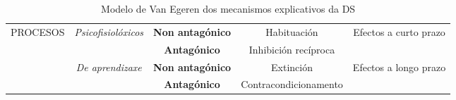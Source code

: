 \documentclass[a4paper,11pt]{article}
\begin{document}
\begin{table}[h!]
\centering
\begin{tabular}{|c|c|c|c|c|}
\hline
\multirow{4}{*}{PROCESOS} & \multirow{2}{*}{\textit{Psicofisiolóxicos}} & \textbf{Non antagónico} & Habituación & \multirow{2}{*}{Efectos a curto prazo} \\ \cline{3-4}
 &  & \textbf{Antagónico} & Inhibición recíproca &  \\ \cline{2-5} 
 & \multirow{2}{*}{\textit{De aprendizaxe}} & \textbf{Non antagónico} & Extinción & \multirow{2}{*}{Efectos a longo prazo} \\ \cline{3-4}
 &  & \textbf{Antagónico} & Contracondicionamento &  \\ \hline
\end{tabular}
\caption{Modelo de Van Egeren dos mecanismos explicativos da DS}
\end{table}
\end{document}
